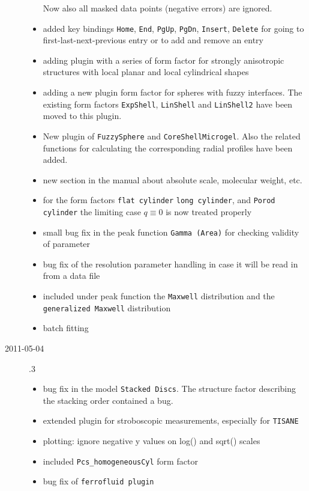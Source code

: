 \begin{description}
\begin{itemize}
            Now also all masked data points (negative errors) are ignored.
      \item added key bindings \texttt{Home}, \texttt{End}, \texttt{PgUp}, \texttt{PgDn}, \texttt{Insert},
            \texttt{Delete} for going to first-last-next-previous entry or to add and remove an entry
      \item adding plugin with a series of form factor for strongly anisotropic structures
            with local planar and local cylindrical shapes
      \item adding a new plugin form factor for spheres with fuzzy interfaces. The existing form factors
            \texttt{ExpShell}, \texttt{LinShell} and \texttt{LinShell2} have been moved to this plugin.
      \item New plugin of \texttt{FuzzySphere} and \texttt{CoreShellMicrogel}.
            Also the related functions for calculating the corresponding radial profiles have been added.
      \item new section in the manual about absolute scale, molecular weight, etc.
      \item for the form factors \texttt{flat cylinder} \texttt{long cylinder}, and \texttt{Porod cylinder}
            the limiting case $q \equiv 0$ is now treated properly
      \item small bug fix in the peak function \texttt{Gamma (Area)} for checking
            validity of parameter
      \item bug fix of the resolution parameter handling in case it will be read in from a data file
      \item included under peak function the \texttt{Maxwell} distribution and the
            \texttt{generalized Maxwell} distribution
      \item batch fitting
    \end{itemize}
    \item[2011-05-04] .3
        \begin{itemize}
        \item  bug fix in the model \texttt{Stacked Discs}. The structure factor describing the
            stacking order contained a bug.
        \item extended plugin for stroboscopic measurements, especially for \texttt{TISANE}
        \item plotting: ignore negative y values on log() and sqrt() scales
        \item included \texttt{Pcs\_homogeneousCyl} form factor
        \item bug fix of \texttt{ferrofluid plugin}

\end{itemize}
\end{description}

